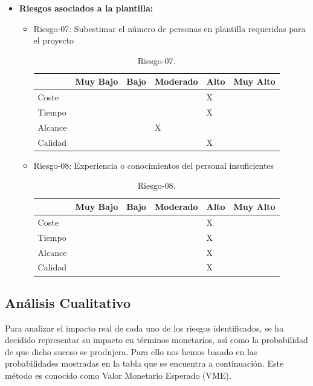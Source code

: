 \begin{itemize}[-]
\item \textbf{Riesgos asociados a la plantilla:}
\begin{itemize}[-]
\item Riesgo-07: Subestimar el número de personas en plantilla requeridas para el proyecto
\begin{table}[H]
\begin{center}
\begin{tabular}{ l l l l l l }
\hline
	 & Muy Bajo & Bajo & Moderado & Alto & Muy Alto \\ \hline \hline
	Coste &  &  &  & X &  \\ \hline
	Tiempo &  &  &  & X &  \\ \hline
	Alcance &  &  & X &  &  \\ \hline
	Calidad &  &  &  & X &  \\ \hline
\end{tabular}
\caption{Riesgo-07.}
\label{Riesgo-07}
\end{center}
\end{table}

\item Riesgo-08: Experiencia o conocimientos del personal insuficientes
\begin{table}[H]
\begin{center}
\begin{tabular}{ l l l l l l }
\hline
	 & Muy Bajo & Bajo & Moderado & Alto & Muy Alto \\ \hline \hline
	Coste &  &  &  & X &  \\ \hline
	Tiempo &  &  &  & X &  \\ \hline
	Alcance &  &  &  & X &  \\ \hline
	Calidad &  &  &  & X &  \\ \hline
\end{tabular}
\caption{Riesgo-08.}
\label{Riesgo-08}
\end{center}
\end{table}
\end{itemize}
\end{itemize}

\subsection{Análisis Cualitativo}
\par Para analizar el impacto real de cada uno de los riesgos identificados, se ha decidido representar su impacto en términos monetarios, así como la probabilidad de que dicho suceso se produjera. Para ello nos hemos basado en las probabilidades mostradas en la tabla que se encuentra a continuación. Este método es conocido como Valor Monetario Esperado (VME).

